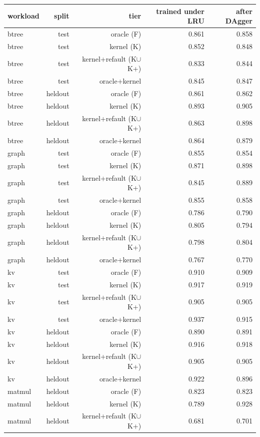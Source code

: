 \begin{tabular}{lrrrr}
\toprule
workload & split & tier & trained under LRU & after DAgger \\
\midrule
btree & test & oracle (F) & 0.861 & 0.858 \\
btree & test & kernel (K) & 0.852 & 0.848 \\
btree & test & kernel{+}refault (K$\cup$K{+}) & 0.833 & 0.844 \\
btree & test & oracle{+}kernel & 0.845 & 0.847 \\
btree & heldout & oracle (F) & 0.861 & 0.862 \\
btree & heldout & kernel (K) & 0.893 & 0.905 \\
btree & heldout & kernel{+}refault (K$\cup$K{+}) & 0.863 & 0.898 \\
btree & heldout & oracle{+}kernel & 0.864 & 0.879 \\
graph & test & oracle (F) & 0.855 & 0.854 \\
graph & test & kernel (K) & 0.871 & 0.898 \\
graph & test & kernel{+}refault (K$\cup$K{+}) & 0.845 & 0.889 \\
graph & test & oracle{+}kernel & 0.855 & 0.858 \\
graph & heldout & oracle (F) & 0.786 & 0.790 \\
graph & heldout & kernel (K) & 0.805 & 0.794 \\
graph & heldout & kernel{+}refault (K$\cup$K{+}) & 0.798 & 0.804 \\
graph & heldout & oracle{+}kernel & 0.767 & 0.770 \\
kv & test & oracle (F) & 0.910 & 0.909 \\
kv & test & kernel (K) & 0.917 & 0.919 \\
kv & test & kernel{+}refault (K$\cup$K{+}) & 0.905 & 0.905 \\
kv & test & oracle{+}kernel & 0.937 & 0.915 \\
kv & heldout & oracle (F) & 0.890 & 0.891 \\
kv & heldout & kernel (K) & 0.916 & 0.918 \\
kv & heldout & kernel{+}refault (K$\cup$K{+}) & 0.905 & 0.905 \\
kv & heldout & oracle{+}kernel & 0.922 & 0.896 \\
matmul & heldout & oracle (F) & 0.823 & 0.823 \\
matmul & heldout & kernel (K) & 0.789 & 0.928 \\
matmul & heldout & kernel{+}refault (K$\cup$K{+}) & 0.681 & 0.701 \\

\end{tabular}
